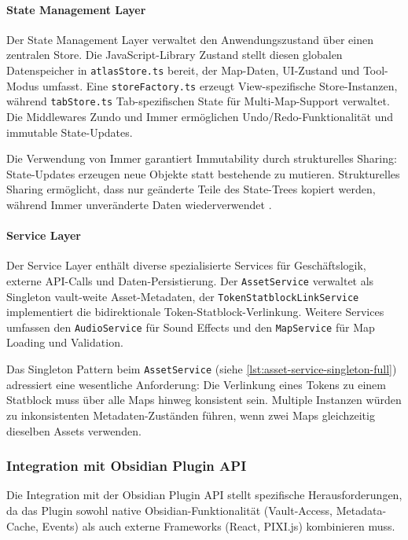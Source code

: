 \paragraph{State Management Layer}

Der State Management Layer verwaltet den Anwendungszustand über einen zentralen Store. Die JavaScript-Library Zustand stellt diesen globalen Datenspeicher in \texttt{atlasStore.ts} bereit, der Map-Daten, \ac{UI}-Zustand und Tool-Modus umfasst. Eine \texttt{storeFactory.ts} erzeugt View-spezifische Store-Instanzen, während \texttt{tabStore.ts} Tab-spezifischen State für Multi-Map-Support verwaltet. Die Middlewares Zundo und Immer ermöglichen Undo/Redo-Funktionalität und immutable State-Updates.

Die Verwendung von Immer garantiert Immutability durch strukturelles Sharing: State-Updates erzeugen neue Objekte statt bestehende zu mutieren. Strukturelles Sharing ermöglicht, dass nur geänderte Teile des State-Trees kopiert werden, während Immer unveränderte Daten wiederverwendet \autocite{ImmerPerformance2024}.

\paragraph{Service Layer}

Der Service Layer enthält diverse spezialisierte Services für Geschäftslogik, externe \ac{API}-Calls und Daten-Persistierung. Der \texttt{AssetService} verwaltet als Singleton vault-weite Asset-Metadaten, der \texttt{TokenStatblockLinkService} implementiert die bidirektionale Token-Statblock-Verlinkung. Weitere Services umfassen den \texttt{AudioService} für Sound Effects und den \texttt{MapService} für Map Loading und Validation.

Das Singleton Pattern beim \texttt{AssetService} (siehe \autoref{lst:asset-service-singleton-full}) adressiert eine wesentliche Anforderung: Die Verlinkung eines Tokens zu einem Statblock muss über alle Maps hinweg konsistent sein. Multiple Instanzen würden zu inkonsistenten Metadaten-Zuständen führen, wenn zwei Maps gleichzeitig dieselben Assets verwenden.

\subsubsection{Integration mit Obsidian Plugin \ac{API}}

Die Integration mit der Obsidian Plugin \ac{API} stellt spezifische Herausforderungen, da das Plugin sowohl native Obsidian-Funktionalität (Vault-Access, Metadata-Cache, Events) als auch externe Frameworks (React, PIXI.js) kombinieren muss.


